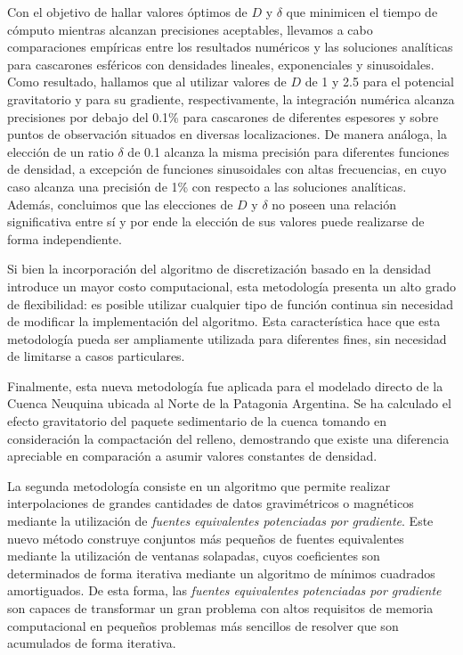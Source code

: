 Con el objetivo de hallar valores óptimos de $D$ y $\delta$ que minimicen el
tiempo de cómputo mientras alcanzan precisiones aceptables, llevamos a cabo
comparaciones empíricas entre los resultados numéricos y las soluciones
analíticas para cascarones esféricos con densidades lineales, exponenciales
y sinusoidales.
Como resultado, hallamos que al utilizar valores de $D$ de 1 y 2.5 para el
potencial gravitatorio y para su gradiente, respectivamente, la integración
numérica alcanza precisiones por debajo del 0.1\% para cascarones de diferentes
espesores y sobre puntos de observación situados en diversas localizaciones.
De manera análoga, la elección de un ratio $\delta$ de 0.1 alcanza la misma
precisión para diferentes funciones de densidad, a excepción de funciones
sinusoidales con altas frecuencias, en cuyo caso alcanza una precisión de 1\%
con respecto a las soluciones analíticas.
Además, concluimos que las elecciones de $D$ y $\delta$ no poseen una relación
significativa entre sí y por ende la elección de sus valores puede realizarse
de forma independiente.

Si bien la incorporación del algoritmo de discretización basado en la densidad
introduce un mayor costo computacional, esta metodología presenta un alto grado
de flexibilidad: es posible utilizar cualquier tipo de función continua sin
necesidad de modificar la implementación del algoritmo.
Esta característica hace que esta metodología pueda ser ampliamente utilizada
para diferentes fines, sin necesidad de limitarse a casos particulares.

Finalmente, esta nueva metodología fue aplicada para el modelado directo de la
Cuenca Neuquina ubicada al Norte de la Patagonia Argentina.
Se ha calculado el efecto gravitatorio del paquete sedimentario de la cuenca
tomando en consideración la compactación del relleno, demostrando que existe
una diferencia apreciable en comparación a asumir valores constantes de
densidad.

\vspace{1em}

La segunda metodología consiste en un algoritmo que permite realizar
interpolaciones de grandes cantidades de datos gravimétricos o magnéticos
mediante la utilización de \emph{fuentes equivalentes potenciadas por
gradiente}.
Este nuevo método construye conjuntos más pequeños de fuentes equivalentes
mediante la utilización de ventanas solapadas, cuyos coeficientes son
determinados de forma iterativa mediante un algoritmo de mínimos cuadrados
amortiguados.
De esta forma, las \emph{fuentes equivalentes potenciadas por gradiente} son
capaces de transformar un gran problema con altos requisitos de memoria
computacional en pequeños problemas más sencillos de resolver que son
acumulados de forma iterativa.

